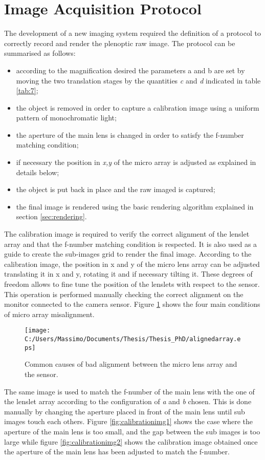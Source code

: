 \section{Image Acquisition Protocol}
\label{sec:protocol}
The development of a new imaging system required the definition of a protocol to correctly record and render the plenoptic raw image. The protocol can be summarised as follows:
\begin{itemize}
	\item according to the magnification desired the parameters a and b are set by moving the two translation stages by the quantities \textit{c} and \textit{d} indicated in table \ref{tab:7};
	\item the object is removed in order to capture a calibration image using a uniform pattern of monochromatic light;
	\item the aperture of the main lens is changed in order to satisfy the f-number matching condition;
	\item if necessary the position in \textit{x,y} of the micro array is adjusted as explained in details below; 
	\item the object is put back in place and the raw imaged is captured;
	\item the final image is rendered using the basic rendering algorithm explained in section \ref{sec:rendering}.
\end{itemize} 
The calibration image is required to verify the correct alignment of the lenslet array and that the f-number matching condition is respected. It is also used as a guide to create the sub-images grid to render the final image. According to the calibration image, the position in x and y of the micro lens array can be adjusted translating it in x and y, rotating it and if necessary tilting it. These degrees of freedom allows to fine tune the position of the lenslets with respect to the sensor. This operation is performed manually checking the correct alignment on the monitor connected to the camera sensor. Figure \ref{fig:calibrationimg3} shows the four main conditions of micro array misalignment.
\begin{figure}[H]
	\centering
	\texttt{[image: C:/Users/Massimo/Documents/Thesis/Thesis\_PhD/alignedarray.eps]}
	\caption{\label{fig:calibrationimg3} Common causes of bad alignment between the micro lens array and the sensor. }
\end{figure}
The same image is used to match the f-number of the main lens with the one of the lenslet array according to the configuration of \textit{a} and \textit{b} chosen. This is done manually by changing the aperture placed in front of the main lens until sub images touch each others. Figure \ref{fig:calibrationimg1} shows the case where the aperture of the main lens is too small, and the gap between the sub images is too large while figure \ref{fig:calibrationimg2} shows the calibration image obtained once the aperture of the main lens has been adjusted to match the f-number.
